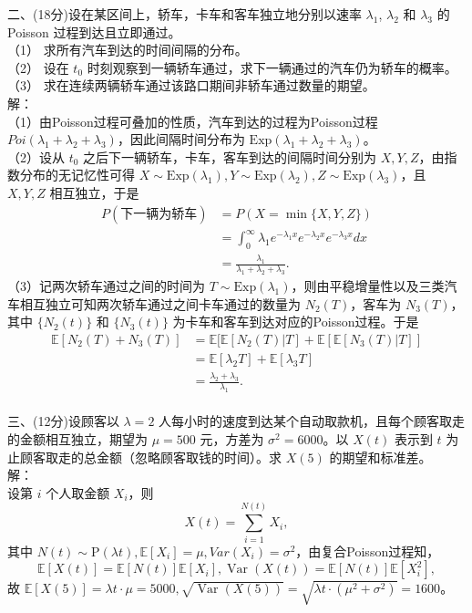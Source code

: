 \documentclass[UTF8,openany]{book}
\begin{document}
\noindent 二、(18分)设在某区间上，轿车，卡车和客车独立地分别以速率 $\lambda_1$, $\lambda_2$ 和 $\lambda_3$ 的 Poisson 过程到达且立即通过。\\
（1） 求所有汽车到达的时间间隔的分布。\\
（2） 设在 $t_0$ 时刻观察到一辆轿车通过，求下一辆通过的汽车仍为轿车的概率。\\
（3） 求在连续两辆轿车通过该路口期间非轿车通过数量的期望。\\
解：\\
（1）由Poisson过程可叠加的性质，汽车到达的过程为Poisson过程 $Poi(\lambda_1+\lambda_2+\lambda_3)$，因此间隔时间分布为 $\mathrm{Exp}(\lambda_1+\lambda_2+\lambda_3)$。\\
（2）设从 $t_0$ 之后下一辆轿车，卡车，客车到达的间隔时间分别为 $X,Y,Z$，由指数分布的无记忆性可得 $X\sim \mathrm{Exp}(\lambda_1),Y\sim \mathrm{Exp}(\lambda_2),Z\sim \mathrm{Exp}(\lambda_3)$，且 $X,Y,Z$ 相互独立，于是
$$
\begin{aligned}
	P(\mbox{下一辆为轿车})&=P(X=\min\{X,Y,Z\})\\&=\int_{0}^\infty \lambda_1e^{-\lambda_1x}e^{-\lambda_2x}e^{-\lambda_3x}dx\\&=\frac{\lambda_1}{\lambda_1+\lambda_2+\lambda_3}.
\end{aligned}
$$
（3）记两次轿车通过之间的时间为 $T\sim \mathrm{Exp}(\lambda_1)$，则由平稳增量性以及三类汽车相互独立可知两次轿车通过之间卡车通过的数量为 $N_2(T)$，客车为 $N_3(T)$，其中 $\{N_2(t)\}$ 和 $\{N_3(t)\}$ 为卡车和客车到达对应的Poisson过程。于是
$$
\begin{aligned}
	\mathbb{E}[N_2(T)+N_3(T)]&=\mathbb{E}[\mathbb{E}[N_2(T)|T]+\mathbb{E}[\mathbb{E}[N_3(T)|T]]\\
	&=\mathbb{E}[\lambda_2T]+\mathbb{E}[\lambda_3T]\\
	&=\frac{\lambda_2+\lambda_3}{\lambda_1}.
\end{aligned}
$$\\


\noindent 三、(12分)设顾客以 $\lambda = 2$ 人每小时的速度到达某个自动取款机，且每个顾客取走的金额相互独立，期望为 $\mu = 500$ 元，方差为 $\sigma^2 = 6000$。以 $X(t)$ 表示到 $t$ 为止顾客取走的总金额（忽略顾客取钱的时间）。求 $X(5)$ 的期望和标准差。\\
解：\\
设第 $i$ 个人取金额 $X_i$，则$$X(t)=\sum_{i=1}^{N(t)}X_i,$$
其中 $N(t) \sim \mathrm{P}(\lambda t),\mathbb{E}[X_i]=\mu,Var(X_i)=\sigma^2$，由复合Poisson过程知，
$$\mathbb{E}[X(t)]=\mathbb{E}[N(t)]\mathbb{E}[X_i],\operatorname{Var}(X(t))=\mathbb{E}[N(t)]\mathbb{E}[X_i^2],$$
故 $\mathbb{E}[X(5)]=\lambda t \cdot \mu=5000,\sqrt{\operatorname{Var}(X(5))}=\sqrt{\lambda t \cdot(\mu^2+\sigma^2)}=1600$。\\
\end{document}
